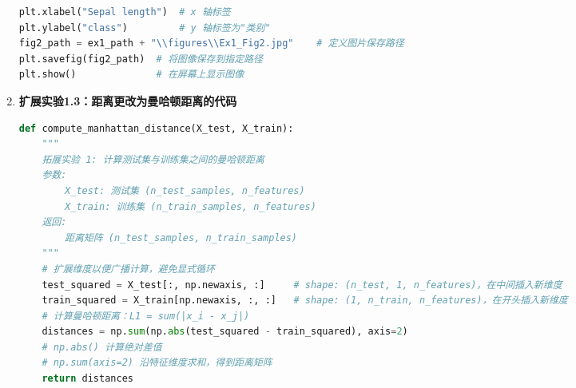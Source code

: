 \documentclass{SCNU_Experimental_Report}
\begin{document}
\begin{enumerate}
\begin{lstlisting}[language=Python]
plt.xlabel("Sepal length")  # x 轴标签
plt.ylabel("class")         # y 轴标签为"类别"
fig2_path = ex1_path + "\\figures\\Ex1_Fig2.jpg"    # 定义图片保存路径
plt.savefig(fig2_path)  # 将图像保存到指定路径
plt.show()              # 在屏幕上显示图像
\end{lstlisting}

    \item \textbf{扩展实验1.3：距离更改为曼哈顿距离的代码}

          \begin{lstlisting}[language=Python]
def compute_manhattan_distance(X_test, X_train):
    """
    拓展实验 1: 计算测试集与训练集之间的曼哈顿距离
    参数:
        X_test: 测试集 (n_test_samples, n_features)
        X_train: 训练集 (n_train_samples, n_features)
    返回:
        距离矩阵 (n_test_samples, n_train_samples)
    """
    # 扩展维度以便广播计算，避免显式循环
    test_squared = X_test[:, np.newaxis, :]     # shape: (n_test, 1, n_features)，在中间插入新维度
    train_squared = X_train[np.newaxis, :, :]   # shape: (1, n_train, n_features)，在开头插入新维度
    # 计算曼哈顿距离：L1 = sum(|x_i - x_j|)
    distances = np.sum(np.abs(test_squared - train_squared), axis=2)
    # np.abs() 计算绝对差值
    # np.sum(axis=2) 沿特征维度求和，得到距离矩阵
    return distances
\end{lstlisting}
\end{enumerate}
\end{document}
